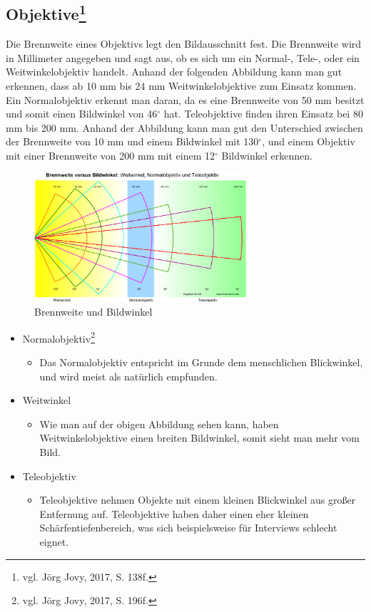 \subsection[Objektive]{Objektive\protect\footnote{\label{}vgl. Jörg Jovy, 2017, S. 138f.}}
Die Brennweite eines Objektivs legt den Bildausschnitt fest. Die Brennweite wird in Millimeter angegeben und sagt aus, ob es sich um ein Normal-, Tele-, oder ein Weitwinkelobjektiv handelt.
Anhand der folgenden Abbildung kann man gut erkennen, dass ab 10 mm bis 24 mm Weitwinkelobjektive zum Einsatz kommen. Ein Normalobjektiv erkennt man daran, da es eine Brennweite von 50 mm besitzt und somit einen Bildwinkel von 46$^\circ$ hat. Teleobjektive finden ihren Einsatz bei 80 mm bis 200 mm. Anhand der Abbildung kann man gut den Unterschied zwischen der Brennweite von 10 mm und einem Bildwinkel mit 130$^\circ$, und einem Objektiv mit einer Brennweite von 200 mm mit einem 12$^\circ$ Bildwinkel erkennen. 
\begin{figure}[H]
	\centering
	\includegraphics[width=0.7\textwidth]{abb1} 
	\caption{Brennweite und Bildwinkel}
\end{figure}
\begin{itemize}
	\item Normalobjektiv\footnote{\label{}vgl. Jörg Jovy, 2017, S. 196f.}
		\begin{itemize}
		\item Das Normalobjektiv entspricht im Grunde dem menschlichen Blickwinkel, und wird meist als natürlich empfunden. 
		\end{itemize}
	\item Weitwinkel
		\begin{itemize}
		\item Wie man auf der obigen Abbildung sehen kann, haben Weitwinkelobjektive einen breiten Bildwinkel, somit sieht man mehr vom Bild. 
		\end{itemize}
	\item Teleobjektiv
		\begin{itemize}
		\item Teleobjektive nehmen Objekte mit einem kleinen Blickwinkel aus großer Entfernung auf. Teleobjektive haben daher einen eher kleinen Schärfentiefenbereich, was sich beispielsweise für Interviews schlecht eignet. 
\end{itemize}
\end{itemize}
